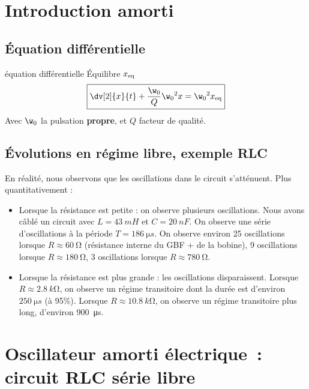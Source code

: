 \documentclass[../main/main.tex]{subfiles}
\begin{document}
\section{Introduction amorti}

\subsection{Équation différentielle}

\begin{prop}[label=prop:eqdiffoh]{équation différentielle}
    Équilibre $x_{\rm eq}$
    \[ \boxed{ \dv[2]{x}{t} + \frac{\w_0}{Q} \w_0{}^2x = \w_0{}^2x_{\rm eq}}\]
    Avec $\w_0$ la pulsation \textbf{propre}, et $Q$ facteur de qualité.
\end{prop}

\subsection{Évolutions en régime libre, exemple RLC}

En réalité, nous observons que les oscillations dans le circuit s’atténuent. Plus quantitativement :

\begin{itemize}
    \item Lorsque la résistance est petite : on observe plusieurs oscillations.
        Nous avons câblé un circuit avec $L = \SI{43}{mH}$ et $C = \SI{20}{nF}$.
        On observe une série d’oscillations à la période $T = \SI{186}{\micro
        s}$. On observe environ 25 oscillations lorsque $R \approx
        \SI{60}{\ohm}$ (résistance interne du GBF + de la bobine), 9
        oscillations lorsque $R \approx \SI{180}{\ohm}$, 3 oscillations lorsque
        $R \approx \SI{780}{\ohm}$.

    \item Lorsque la résistance est plus grande : les oscillations
        disparaissent. Lorsque $R \approx \SI{2,8}{k\ohm}$, on observe un régime
        transitoire dont la durée est d’environ $\SI{250}{\micro s}$ (à 95\%).
        Lorsque $R \approx \SI{10,8}{k\ohm}$, on observe un régime transitoire
        plus long, d’environ \SI{900}{\micro s}.

\end{itemize}

\section{Oscillateur amorti électrique~: circuit RLC série libre}
\end{document}
